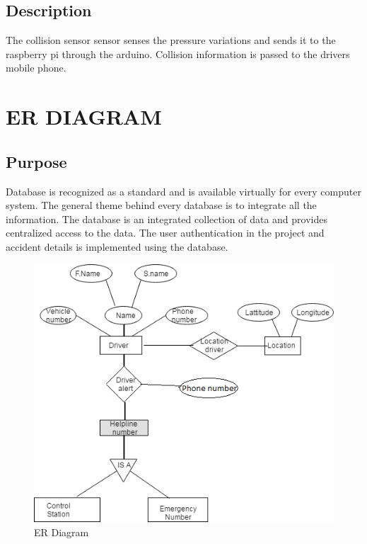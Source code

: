 \documentclass[12pt,a4paper,oneside]{report}
\begin{document}
{\subsection{Description}
\par The collision sensor  sensor senses the pressure variations and sends it to the raspberry pi through the arduino. Collision information is passed to the drivers mobile phone.

\newpage
\section{ER DIAGRAM}

\subsection{Purpose}
\par Database is recognized as a standard and is available virtually for every computer system.
The general theme behind every database is to integrate all the information. The database is an
integrated collection of data and provides centralized access to the data. The user authentication
in the project and accident details is implemented using the database.\\

\begin{figure}[h]
\begin{center}
\includegraphics[scale=.9]{erdiagram.png}
\caption{ER Diagram }
\label{ER Diagram}
\end{center}
\end{figure}
}
\end{document}
